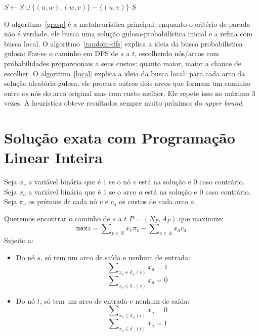 \documentclass[7pt]{article}
\newcommand{\tit}[1]{\textit{#1}}
\newcommand{\ttt}[1]{\texttt{#1}}
\begin{document}
\begin{algorithm}
\caption{}\label{local}
\begin{algorithmic}[1]
                \State $S \gets S \cup{\{(u, w), (w, v)\}} - \{(u, v)\}$
            \EndIf
        \EndIf
	\EndFor
    \EndWhile
    \Return $S$
    \EndProcedure
\end{algorithmic}
\end{algorithm}

\begin{multicols}{2}
O algoritmo~\ref{grasp} é a metaheurística principal:
enquanto o critério de parada não é verdade,
ele busca uma solução gulosa-probabilística inicial
e a refina com busca local.
O algoritmo~\ref{random-dfs} explica a ideia da busca probabilística gulosa:
Faz-se o caminho em DFS de $s$ a $t$, escolhendo nós/arcos com probabilidades
proporcionais a seus custos: quanto maior, maior a chance de escolher.
O algoritmo~\ref{local} explica a ideia da busca local:
para cada arco da solução aleatória-gulosa, ele procura outros dois arcos
que formam um caminho entre os nós do arco original mas com custo melhor.
Ele repete isso no máximo 3 vezes.
A heurística obteve resultados sempre muito próximos do \tit{upper bound}.

\section{Solução exata com Programação Linear Inteira}
Seja $x_v$ a variável binária que é $1$ se o nó $v$ está na solução e
$0$ caso contrário.
Seja $x_a$ a variável binária que é $1$ se o arco $a$ está na solução e
$0$ caso contrário.
Seja $\pi_v$ os prêmios de cada nó $v$ e $c_a$ os custos de cada arco $a$.

Queremos encontrar o caminho de $s$ a $t$ $P = (N_P, A_P)$ que maximize:
$$\ttt{max} z = \sum\nolimits_{v \in N}x_v \pi_v
    - \sum\nolimits_{a \in A}x_a c_a$$
Sujeito a:
\begin{itemize}
    \item Do nó $s$, só tem um arco de saída e nenhum de entrada:
        $$\sum\nolimits_{x_a \in \delta_+(s)}x_a = 1$$
        $$\sum\nolimits_{x_a \in \delta_-(s)}x_a = 0$$

    \item Do nó $t$, só tem um arco de entrada e nenhum de saída:
        $$\sum\nolimits_{x_a \in \delta_+(t)}x_a = 0$$
        $$\sum\nolimits_{x_a \in \delta_-(t)}x_a = 1$$


\end{itemize}
\end{multicols}
\end{document}
